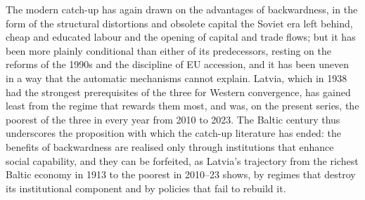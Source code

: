 The modern catch-up has again drawn on the advantages of backwardness, in the form of the structural distortions and obsolete capital the Soviet era left behind, cheap and educated labour and the opening of capital and trade flows; but it has been more plainly conditional than either of its predecessors, resting on the reforms of the 1990s and the discipline of EU accession, and it has been uneven in a way that the automatic mechanisms cannot explain. Latvia, which in 1938 had the strongest prerequisites of the three for Western convergence, has gained least from the regime that rewards them most, and was, on the present series, the poorest of the three in every year from 2010 to 2023. The Baltic century thus underscores the proposition with which the catch-up literature has ended: the benefits of backwardness are realised only through institutions that enhance social capability, and they can be forfeited, as Latvia's trajectory from the richest Baltic economy in 1913 to the poorest in 2010--23 shows, by regimes that destroy its institutional component and by policies that fail to rebuild it.

